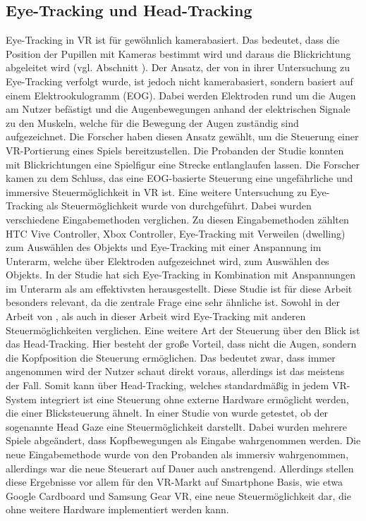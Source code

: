 \subsection{Eye-Tracking und Head-Tracking}
\label{eyetrackingVR}
Eye-Tracking in VR ist für gewöhnlich kamerabasiert. Das bedeutet, dass die Position der Pupillen mit Kameras bestimmt wird und daraus die Blickrichtung abgeleitet wird (vgl. Abschnitt ). Der Ansatz, der von \citeauthor{D.Kumar.2016} in ihrer Untersuchung zu Eye-Tracking verfolgt wurde, ist jedoch nicht kamerabasiert, sondern basiert auf einem Elektrookulogramm (EOG). Dabei werden Elektroden rund um die Augen am Nutzer befästigt und die Augenbewegungen anhand der elektrischen Signale zu den Muskeln, welche für die Bewegung der Augen zuständig sind aufgezeichnet. Die Forscher haben diesen Ansatz gewählt, um die Steuerung einer VR-Portierung eines Spiels bereitzustellen. Die Probanden der Studie konnten mit Blickrichtungen eine Spielfigur eine Strecke entlanglaufen lassen. Die Forscher kamen zu dem Schluss, das eine EOG-basierte Steuerung eine ungefährliche und immersive Steuermöglichkeit in VR ist\cite{D.Kumar.2016}. 
Eine weitere Untersuchung zu Eye-Tracking als Steuermöglichkeit wurde von \citeauthor{Pai.2019} durchgeführt. Dabei wurden verschiedene Eingabemethoden verglichen. Zu diesen Eingabemethoden zählten HTC Vive Controller, Xbox Controller, Eye-Tracking mit Verweilen (dwelling) zum Auswählen des Objekts und Eye-Tracking mit einer Anspannung im Unterarm, welche über Elektroden aufgezeichnet wird, zum Auswählen des Objekts. In der Studie hat sich Eye-Tracking in Kombination mit Anspannungen im Unterarm als am effektivsten herausgestellt\cite{Pai.2019}. Diese Studie ist für diese Arbeit besonders relevant, da die zentrale Frage eine sehr ähnliche ist. Sowohl in der Arbeit von \citeauthor{Pai.2019}, als auch in dieser Arbeit wird Eye-Tracking mit anderen Steuermöglichkeiten verglichen.
Eine weitere Art der Steuerung über den Blick ist das Head-Tracking. Hier besteht der große Vorteil, dass nicht die Augen, sondern die Kopfposition die Steuerung ermöglichen. Das bedeutet zwar, dass immer angenommen wird der Nutzer schaut direkt voraus, allerdings ist das meistens der Fall. Somit kann über Head-Tracking, welches standardmäßig in jedem VR-System integriert ist eine Steuerung ohne externe Hardware ermöglicht werden, die einer Blicksteuerung ähnelt. In einer Studie von \citeauthor{R.Atienza.2016} wurde getestet, ob der sogenannte \glqq Head Gaze\grqq{} eine Steuermöglichkeit darstellt. Dabei wurden mehrere Spiele abgeändert, dass Kopfbewegungen als Eingabe wahrgenommen werden. Die neue Eingabemethode wurde von den Probanden als immersiv wahrgenommen, allerdings war die neue Steuerart auf Dauer auch anstrengend. Allerdings stellen diese Ergebnisse vor allem für den VR-Markt auf Smartphone Basis, wie etwa Google Cardboard und Samsung Gear VR, eine neue Steuermöglichkeit dar, die ohne weitere Hardware implementiert werden kann\cite{R.Atienza.2016}. 

